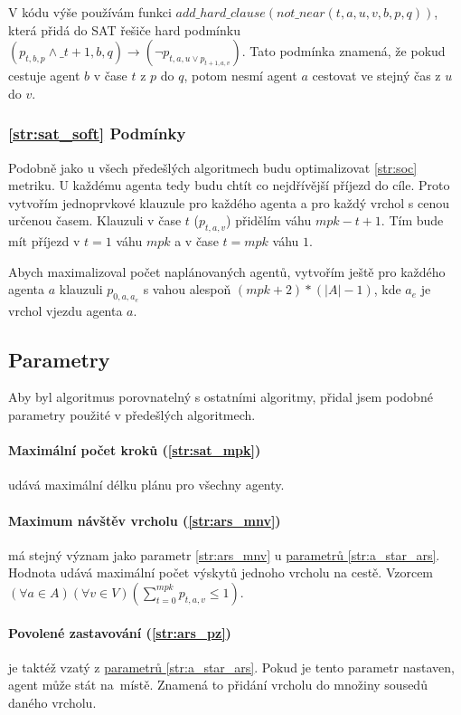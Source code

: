 V kódu výše používám funkci $add\_hard\_clause(not\_near(t, a, u, v, b, p, q))$,
která přidá do SAT řešiče hard podmínku $(p_{t,b,p} \wedge \_{t+1,b,q}) \rightarrow (\neg p_{t,a,u \vee p_{t+1,a,v}})$.
Tato podmínka znamená, že pokud cestuje agent $b$ v čase $t$ z $p$ do $q$,
potom nesmí agent $a$ cestovat ve stejný čas z $u$ do $v$.

\subsubsection{\ref{str:sat_soft} Podmínky}\label{subsubsec:sat_soft_podminky}

Podobně jako u všech předešlých algoritmech budu optimalizovat \ref{str:soc} metriku.
U každému agenta tedy budu chtít co nejdřívější příjezd do cíle.
Proto vytvořím jednoprvkové klauzule pro každého agenta a pro každý vrchol s cenou určenou časem.
Klauzuli v čase $t$ ($p_{t, a, v}$) přidělím váhu $mpk - t + 1$.
Tím bude mít příjezd v $t = 1$ váhu $mpk$ a v čase $t = mpk$ váhu $1$.

Abych maximalizoval počet naplánovaných agentů, vytvořím ještě pro každého agenta $a$
klauzuli $p_{0, a, a_e}$ s vahou alespoň $(mpk + 2) * (|A| - 1)$, kde $a_e$ je vrchol vjezdu agenta $a$.

\subsection{Parametry}\label{subsec:sat_parametry}

Aby byl algoritmus porovnatelný s ostatními algoritmy, přidal jsem podobné parametry použité v předešlých algoritmech.

\paragraph{Maximální počet kroků (\ref{str:sat_mpk})}
udává maximální délku plánu pro všechny agenty.

\paragraph{Maximum návštěv vrcholu (\ref{str:ars_mnv})} má stejný význam jako
parametr \ref{str:ars_mnv} u \hyperref[subsubsec:ars_parametry]{parametrů \ref{str:a_star_ars}}.
Hodnota udává maximální počet výskytů jednoho vrcholu na cestě.
Vzorcem $(\forall a \in A)(\forall v \in V)(\sum_{t=0}^{mpk} p_{t, a, v} \leq 1)$.

\paragraph{Povolené zastavování (\ref{str:ars_pz})}\label{par:sat_povolene_zastavovani} je taktéž vzatý
z \hyperref[subsubsec:ars_parametry]{parametrů \ref{str:a_star_ars}}.
Pokud je tento parametr nastaven, agent může stát na~místě.
Znamená to přidání vrcholu do množiny sousedů daného vrcholu.

